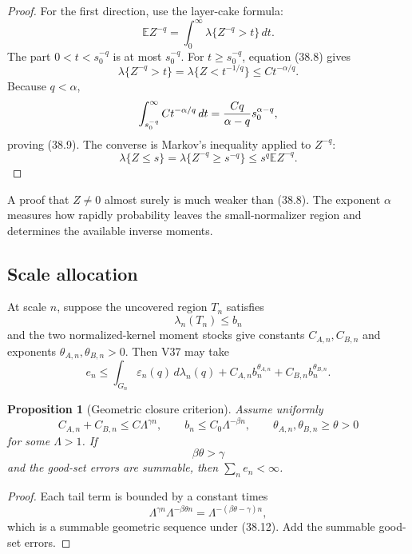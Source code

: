 \documentclass[11pt]{article}
\newtheorem{proposition}[theorem]{Proposition}
\theoremstyle{remark}
\begin{document}
\begin{proof}
For the first direction, use the layer-cake formula:
\[
 \mathbb E Z^{-q}
 =
 \int_0^\infty
 \lambda\{Z^{-q}>t\}\,dt.
\]
The part \(0<t<s_0^{-q}\) is at most \(s_0^{-q}\).  For
\(t\geq s_0^{-q}\), equation (38.8) gives
\[
 \lambda\{Z^{-q}>t\}
 =
 \lambda\{Z<t^{-1/q}\}
 \leq Ct^{-\alpha/q}.
\]
Because \(q<\alpha\),
\[
 \int_{s_0^{-q}}^\infty Ct^{-\alpha/q}\,dt
 =
 {Cq\over\alpha-q}s_0^{\alpha-q},
\]
proving (38.9).  The converse is Markov's inequality applied to
\(Z^{-q}\):
\[
 \lambda\{Z\leq s\}
 =
 \lambda\{Z^{-q}\geq s^{-q}\}
 \leq s^q\mathbb E Z^{-q}.
\]
\end{proof}

A proof that \(Z\ne0\) almost surely is much weaker than (38.8).
The exponent \(\alpha\) measures how rapidly probability leaves the
small-normalizer region and determines the available inverse
moments.

\subsection{Scale allocation}

At scale \(n\), suppose the uncovered region \(T_n\) satisfies
\[
 \lambda_n(T_n)\leq b_n
\]
and the two normalized-kernel moment stocks give constants
\(C_{A,n},C_{B,n}\) and exponents
\(\theta_{A,n},\theta_{B,n}>0\).  Then V37 may take
\begin{equation}
 e_n
 \leq
 \int_{G_n}\varepsilon_n(q)\,d\lambda_n(q)
 +
 C_{A,n}b_n^{\theta_{A,n}}
 +
 C_{B,n}b_n^{\theta_{B,n}}.                     \tag{38.11}
\end{equation}

\begin{proposition}[Geometric closure criterion]
\label{prop:v12v38-geometric}
Assume uniformly
\[
 C_{A,n}+C_{B,n}\leq C\Lambda^{\gamma n},
 \qquad
 b_n\leq C_0\Lambda^{-\beta n},
 \qquad
 \theta_{A,n},\theta_{B,n}\geq\theta>0
\]
for some \(\Lambda>1\).  If
\begin{equation}
                         \beta\theta>\gamma       \tag{38.12}
\end{equation}
and the good-set errors are summable, then
\(\sum_ne_n<\infty\).
\end{proposition}

\begin{proof}
Each tail term is bounded by a constant times
\[
 \Lambda^{\gamma n}\Lambda^{-\beta\theta n}
 =
 \Lambda^{-(\beta\theta-\gamma)n},
\]
which is a summable geometric sequence under (38.12).  Add the
summable good-set errors.
\end{proof}
\end{document}
